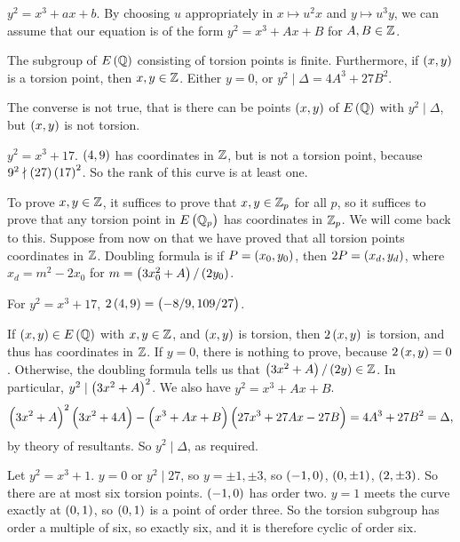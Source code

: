 $ y^2 = x^3 + ax + b $. By choosing $ u $ appropriately in $ x \mapsto u^2x $ and $ y \mapsto u^3y $, we can assume that our equation is of the form $ y^2 = x^3 + Ax + B $ for $ A, B \in \mathbb{Z} $.

\begin{theorem}
The subgroup of $ E\br{\Q} $ consisting of torsion points is finite. Furthermore, if $ \br{x, y} $ is a torsion point, then $ x, y \in \mathbb{Z} $. Either $ y = 0 $, or $ y^2 \mid \Delta = 4A^3 + 27B^2 $.
\end{theorem}

\begin{note*}
The converse is not true, that is there can be points $ \br{x, y} $ of $ E\br{\Q} $ with $ y^2 \mid \Delta $, but $ \br{x, y} $ is not torsion.
\end{note*}

\begin{example*}
$ y^2 = x^3 + 17 $. $ \br{4, 9} $ has coordinates in $ \mathbb{Z} $, but is not a torsion point, because $ 9^2 \nmid \br{27}\br{17}^2 $. So the rank of this curve is at least one.
\end{example*}

To prove $ x, y \in \mathbb{Z} $, it suffices to prove that $ x, y \in \mathbb{Z}_p $ for all $ p $, so it suffices to prove that any torsion point in $ E\br{\Q_p} $ has coordinates in $ \mathbb{Z}_p $. We will come back to this. Suppose from now on that we have proved that all torsion points coordinates in $ \mathbb{Z} $. Doubling formula is if $ P = \br{x_0, y_0} $, then $ 2P = \br{x_d, y_d} $, where $ x_d = m^2 - 2x_0 $ for $ m = \br{3x_0^2 + A} / \br{2y_0} $.

\begin{example*}
For $ y^2 = x^3 + 17 $, $ 2\br{4, 9} = \br{-8 / 9, 109 / 27} $.
\end{example*}

If $ \br{x, y} \in E\br{\Q} $ with $ x, y \in \mathbb{Z} $, and $ \br{x, y} $ is torsion, then $ 2\br{x, y} $ is torsion, and thus has coordinates in $ \mathbb{Z} $. If $ y = 0 $, there is nothing to prove, because $ 2\br{x, y} = 0 $. Otherwise, the doubling formula tells us that $ \br{3x^2 + A} / \br{2y} \in \Z $. In particular, $ y^2 \mid \br{3x^2 + A}^2 $. We also have $ y^2 = x^3 + Ax + B $.
$$ \br{3x^2 + A}^2\br{3x^2 + 4A} - \br{x^3 + Ax + B}\br{27x^3 + 27Ax - 27B} = 4A^3 + 27B^2 = \Delta, $$
by theory of resultants. So $ y^2 \mid \Delta $, as required.

\begin{example*}
Let $ y^2 = x^3 + 1 $. $ y = 0 $ or $ y^2 \mid 27 $, so $ y = \pm 1, \pm 3 $, so $ \br{-1, 0} $, $ \br{0, \pm 1} $, $ \br{2, \pm 3} $. So there are at most six torsion points. $ \br{-1, 0} $ has order two. $ y = 1 $ meets the curve exactly at $ \br{0, 1} $, so $ \br{0, 1} $ is a point of order three. So the torsion subgroup has order a multiple of six, so exactly six, and it is therefore cyclic of order six.
\end{example*}

